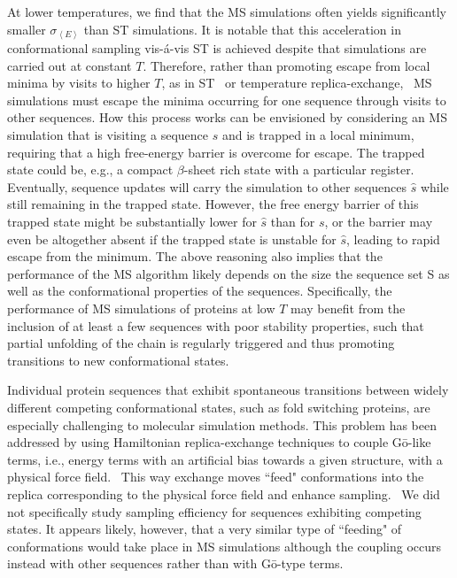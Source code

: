 \documentclass[
aip,
rsi,%
amsmath,amssymb,
reprint,%
]{revtex4-1}
\newcommand {\sigE}	{{\sigma_{\left < E \right >}}}
\begin{document}
At lower temperatures, we find that the MS simulations often yields significantly smaller $\sigE$ than ST simulations. It is notable that this acceleration in conformational sampling vis-{\'a}-vis ST is achieved despite that simulations are carried out at constant $T$. {\color{red} Therefore, rather than promoting escape from local minima by visits to higher $T$, as in  ST~\cite{Marinari1992,Lyubartsev1992} or temperature replica-exchange,~\cite{Swendsen1986} MS simulations must escape the minima occurring for one sequence through visits to other sequences. How this process works can be envisioned by considering an MS simulation that is visiting a sequence $s$ and is trapped in a local minimum, requiring that a high free-energy barrier is overcome for escape. The trapped state could be, e.g., a compact $\beta$-sheet rich state with a particular register. Eventually, sequence updates will carry the simulation to other sequences $\hat{s}$ while still remaining in the trapped state. However, the free energy barrier of this trapped state might be substantially lower for $\hat{s}$ than for $s$, or the barrier may even be altogether absent if the trapped state is unstable for $\hat{s}$, leading to rapid escape from the minimum. } The above reasoning also implies that the performance of the MS algorithm likely depends on the size the sequence set S as well as the conformational properties of the sequences. Specifically, the performance of MS simulations of proteins at low $T$ may benefit from the inclusion of at least a few sequences with poor stability properties, such that partial unfolding of the chain is regularly triggered and thus promoting transitions to new conformational states. 

{\color{red} Individual protein sequences that exhibit spontaneous transitions between widely different competing conformational states, such as fold switching proteins, are especially challenging to molecular simulation methods. This problem has been addressed by using Hamiltonian replica-exchange techniques to couple G\={o}-like terms, i.e., energy terms with an artificial bias towards a given structure, with a physical force field.~\cite{Meinke2007,Chen2014,Bernhardt2016} This way exchange moves ``feed" conformations into the replica corresponding to the physical force field and enhance sampling.~\cite{Bernhardt2016} We did not specifically study sampling efficiency for sequences exhibiting competing states. It appears likely, however, that a very similar type of ``feeding" of conformations would take place in MS simulations although the coupling occurs instead with other sequences rather than with G\={o}-type terms. }
\end{document}
